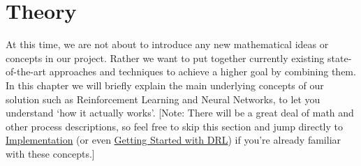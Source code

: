 \documentclass[a4paper,oneside,dvipsnames]{article}
\begin{document}
\noindent
\section[Theory]{Theory}
At this time, we are not about to introduce any new mathematical ideas or concepts in our project. Rather we want to put together currently existing state-of-the-art approaches and techniques to achieve a higher goal by combining them. In this chapter we will briefly explain the main underlying concepts of our solution such as Reinforcement Learning and Neural Networks, to let you understand ‘how it actually works’. [Note: There will be a great deal of math and other process descriptions, so feel free to skip this section and jump directly to \hyperref[sec:implementation]{Implementation} (or even \hyperref[sec:gettingStarted]{Getting Started with DRL}) if you're already familiar with these concepts.]
\end{document}
